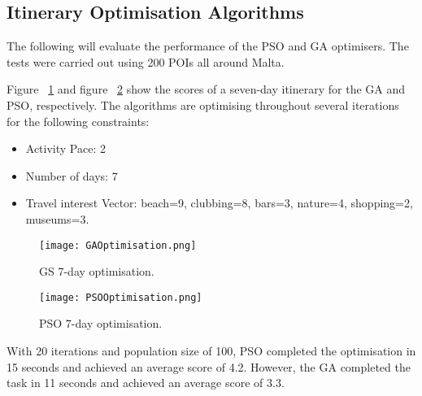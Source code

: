 \subsection{Itinerary Optimisation Algorithms}

The following will evaluate the performance of the PSO
and GA optimisers. The tests were carried out using
200 POIs all around Malta.

Figure ~\ref{GAOptimisation} and figure ~\ref{PSOoptimise} show the scores of a seven-day
itinerary for the GA and PSO, respectively. The
algorithms are optimising throughout several
iterations for the following constraints:

\begin{itemize}
    \item Activity Pace: 2
    \item Number of days: 7
    \item Travel interest Vector:  beach=9, clubbing=8, bars=3, nature=4, shopping=2, museums=3.
\end{itemize}

\begin{figure}[h]
\centering
        \texttt{[image: GAOptimisation.png]}
        \caption{GS 7-day optimisation.}
        \label{GAOptimisation}
\end{figure}

\begin{figure}[h]
\centering
        \texttt{[image: PSOOptimisation.png]} 
        \caption{PSO 7-day optimisation.}
        \label{PSOoptimise}
\end{figure}




With 20 iterations and population size of 100, PSO
completed the optimisation in 15 seconds and achieved
an average score of 4.2. However, the GA completed the
task in 11 seconds and achieved an average score of
3.3.

